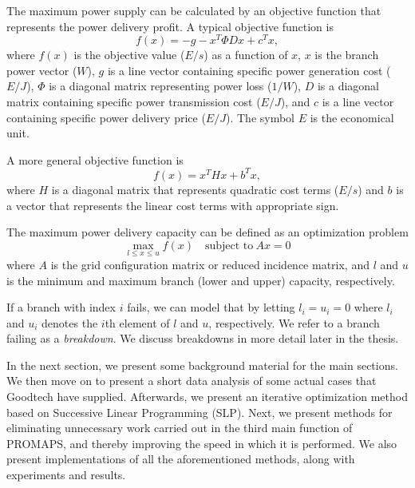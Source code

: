 \documentclass[a4paper, twocolumn]{article}
\begin{document}
The maximum power
supply can be calculated by an objective function that represents the power
delivery profit. A typical objective function is
\[
f(x) = -g - x^T \Phi D x + c^T x,
\]
where $f(x)$ is the objective value ($E/s$) as a function of $x$, $x$ is the
branch power vector ($W$), $g$ is a line vector containing specific power
generation cost ($E/J$), $\Phi$ is a diagonal matrix representing power loss
($1/W$), $D$ is a diagonal matrix containing specific power transmission cost
($E/J$), and $c$ is a line vector containing specific power delivery price
($E/J$).
The symbol $E$ is the economical unit\cite{digernes}.

A more general objective function is
\begin{equation}
    f(x) = x^T H x + b^T x, \label{eq:obj}
\end{equation}
where $H$ is a diagonal matrix that represents quadratic cost terms ($E/s$) and
$b$ is a vector that represents the linear cost terms with appropriate
sign\cite{digernes}.

The maximum power delivery capacity can be defined as an optimization problem
\begin{equation}
   \max_{l \le x \le u} f(x)\quad\textrm{subject to}~Ax = 0 \label{eq:thesisqp}
\end{equation}
where $A$ is the grid configuration matrix or reduced incidence matrix, and
$l$ and $u$ is the minimum and maximum branch (lower and upper) capacity,
respectively\cite{digernes}.

If a branch with index $i$ fails, we can model that by letting
$l_i = u_i = 0$ where $l_i$ and $u_i$ denotes the $i$th element of $l$ and
$u$, respectively. We refer to a branch failing as a \textit{breakdown}.
We discuss breakdowns in more detail later in the thesis.

In the next section, we present some background material for the
main sections. We then move on to present a short data analysis of
some actual cases that Goodtech have supplied. Afterwards, we present
an iterative optimization method based on Successive Linear Programming (SLP).
Next, we present methods for eliminating unnecessary work carried out in the
third main function of PROMAPS, and thereby improving the speed in which it is
performed.
We also present implementations of all the aforementioned methods, along with
experiments and results.








{}


\onecolumn

\end{document}
